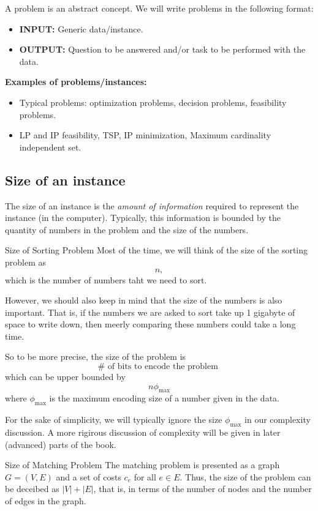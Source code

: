 A problem is an abstract concept. We will write problems in the following format:
\begin{itemize}
	\item {\bf INPUT:} Generic data/instance.
	\item {\bf OUTPUT:} Question to be answered and/or task to be performed with the data.
\end{itemize}


{\bf Examples of problems/instances:}
	\begin{itemize}
	  \item Typical problems: optimization problems, decision problems, feasibility problems.
		\item LP and IP feasibility, TSP, IP minimization, Maximum cardinality independent set.
	\end{itemize}
	
	\subsection{Size of an instance}
	
The size of an instance is the {\em amount of information} required to represent the instance (in the computer).	Typically, this information is bounded by the quantity of numbers in the problem and the size of the numbers.

\begin{example}{Size of Sorting Problem}{}
Most of the time, we will think of the size of the sorting problem as 
$$
n,
$$
which is the number of numbers taht we need to sort.

However, we should also keep in mind that the size of the numbers is also important.  That is, if the numbers we are asked to sort take up 1 gigabyte of space to write down, then meerly comparing these numbers could take a long time. 

So to be more precise, the size of the problem is
$$
\# \text{ of bits to encode the problem }
$$
which can be upper bounded by 
$$
n \phi_{\max}
$$
where $\phi_{\max}$ is the maximum encoding size of a number given in the data.

For the sake of simplicity, we will typically ignore the size $\phi_{\max}$ in our complexity discussion.  A more rigirous discussion of complexity will be given in later (advanced) parts of the book.
\end{example}


\begin{example}{Size of Matching Problem}{}
The matching problem is presented as a graph $G= (V,E)$ and a set of costs $c_e$ for all $e \in E$.  Thus, the size of the problem can be deceibed as $|V| + |E|$, that is, in terms of the number of nodes and the number of edges in the graph.

\end{example}



